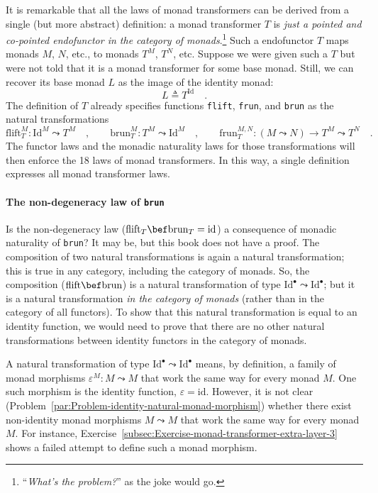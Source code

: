 It is remarkable that all the laws of monad transformers can be derived
from a single (but more abstract) definition: a monad transformer
$T$ is \emph{just a pointed and co-pointed endofunctor in the category
of monads}.\footnote{\textsf{``}\emph{What\textsf{'}s the problem?}\textsf{''} as the joke would go.}
Such a endofunctor $T$ maps monads $M$, $N$, etc., to monads $T^{M}$,
$T^{N}$, etc. Suppose we were given such a $T$ but were not told
that it is a monad transformer for some base monad. Still, we can
recover its base monad $L$ as the image of the identity monad:
\[
L\triangleq T^{\text{Id}}\quad.
\]
The definition of $T$ already specifies functions \lstinline!flift!,
\lstinline!frun!, and \lstinline!brun! as the natural transformations
\[
\text{flift}_{T}^{M}:\text{Id}^{M}\leadsto T^{M}\quad,\quad\quad\text{brun}_{T}^{M}:T^{M}\leadsto\text{Id}^{M}\quad,\quad\quad\text{frun}_{T}^{M,N}:(M\leadsto N)\rightarrow T^{M}\leadsto T^{N}\quad.
\]
The functor laws and the monadic naturality laws for those transformations
will then enforce the 18 laws of monad transformers. In this way,
a single definition expresses all monad transformer laws.

\paragraph{The non-degeneracy law of \texttt{brun}}

Is the non-degeneracy law ($\text{flift}_{T}\bef\text{brun}_{T}=\text{id}$)
a consequence of monadic naturality of \lstinline!brun!? It may be,
but this book does not have a proof. The composition of two natural
transformations is again a natural transformation; this is true in
any category, including the category of monads. So, the composition
($\text{flift}\bef\text{brun}$) is a natural transformation of type
$\text{Id}^{\bullet}\leadsto\text{Id}^{\bullet}$; but it is a natural
transformation \emph{in the category of monads} (rather than in the
category of all functors). To show that this natural transformation
is equal to an identity function, we would need to prove that there
are no other natural transformations between identity functors in
the category of monads.

A natural transformation of type $\text{Id}^{\bullet}\leadsto\text{Id}^{\bullet}$
means, by definition, a family of monad morphisms $\varepsilon^{M}:M\leadsto M$
that work the same way for every monad $M$. One such morphism is
the identity function, $\varepsilon=\text{id}$. However, it is not
clear (Problem~\ref{par:Problem-identity-natural-monad-morphism})
whether there exist non-identity monad morphisms $M\leadsto M$ that
work the same way for every monad $M$. For instance, Exercise~\ref{subsec:Exercise-monad-transformer-extra-layer-3}
shows a failed attempt to define such a monad morphism.

